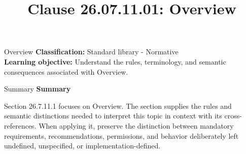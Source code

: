 \documentclass[10pt,letterpaper]{article}
\title{Clause 26.07.11.01: Overview}
\author{}
\date{}
\begin{document}
\maketitle
\begin{CornellOverviewBox}{Overview}
\textbf{Classification:} Standard library - Normative\\[2pt]
\textbf{Learning objective:} Understand the rules, terminology, and semantic consequences associated with Overview.
\end{CornellOverviewBox}\begin{CornellSummaryBox}{Summary}
{\sffamily\bfseries\color{Accent} Summary}\par\vspace{3pt}Section 26.7.11.1 focuses on Overview. The section supplies the rules and semantic distinctions needed to interpret this topic in context with its cross-references. When applying it, preserve the distinction between mandatory requirements, recommendations, permissions, and behavior deliberately left undefined, unspecified, or implementation-defined.
\end{CornellSummaryBox}
\end{document}

